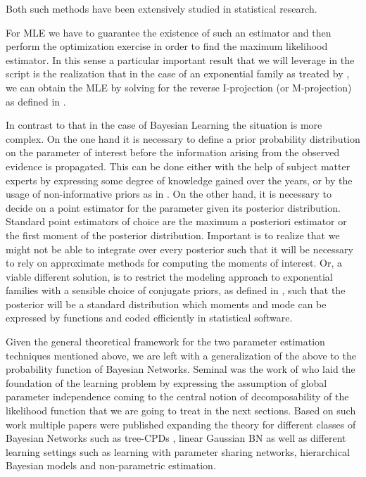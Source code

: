 \documentclass[11pt]{article}
\begin{document}
\begin{article}
Both such methods have been extensively studied in statistical
research.

For MLE we have to guarantee the existence of such an estimator and
then perform the optimization exercise in order to find the maximum
likelihood estimator. In this sense a particular important result
that we will leverage in the script is the realization that in
the case of an exponential family as treated by
\cite{barndorff1978hyperbolic}, we can obtain the MLE by solving for
the reverse I-projection (or M-projection) as defined in
\cite{csiszar1975divergence}.

In contrast to that in the case of Bayesian Learning the situation
is more complex. On the one hand it is necessary to define a prior
probability distribution on the parameter of interest before the
information arising from the observed evidence is propagated. This
can be done either with the help of subject matter experts by
expressing some degree of knowledge gained over the years, or by
the usage of non-informative priors as in
\cite{syversveen1998noninformative}. On the other hand, it is
necessary to decide on a point estimator for the parameter given
its posterior distribution. Standard point estimators of choice are
the maximum a posteriori estimator or the first moment of the
posterior distribution. Important is to realize that we might not
be able to integrate over every posterior such that it will be
necessary to rely on approximate methods for computing the moments
of interest. Or, a viable different solution, is to restrict the
modeling approach to exponential families with a sensible choice of
conjugate priors, as defined in \cite{schlaifer1961applied}, such
that the posterior will be a standard distribution which moments
and mode can be expressed by functions and coded efficiently in
statistical software.

Given the general theoretical framework for the two parameter
estimation techniques mentioned above, we are left with a
generalization of the above to the probability function of Bayesian
Networks. Seminal was the work of \cite{spiegelhalter1990sequential}
who laid the foundation of the learning problem by expressing the
assumption of global parameter independence coming to the central
notion of decomposability of the likelihood function that we are
going to treat in the next sections. Based on such work multiple
papers were published expanding the theory for different classes of
Bayesian Networks such as tree-CPDs \cite{buntine1993tree}, linear
Gaussian BN \cite{heckerman1995learning} as well as different
learning settings such as learning with parameter sharing networks,
hierarchical Bayesian models and non-parametric estimation.


\end{article}
\end{document}
